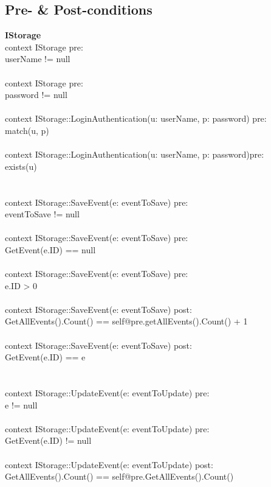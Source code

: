\subsection{Pre- \& Post-conditions}
\textbf{IStorage\\}
context IStorage pre:\\
userName != null\\\\
context IStorage pre:\\
password != null\\\\
context IStorage::LoginAuthentication(u: userName, p: password) pre:\\
match(u, p)\\\\
context IStorage::LoginAuthentication(u: userName, p: password)pre:\\
exists(u)\\\\\\
context IStorage::SaveEvent(e: eventToSave) pre:\\
eventToSave != null\\\\
context IStorage::SaveEvent(e: eventToSave) pre:\\
GetEvent(e.ID) == null\\\\
context IStorage::SaveEvent(e: eventToSave) pre:\\
e.ID > 0\\\\
context IStorage::SaveEvent(e: eventToSave) post:\\
GetAllEvents().Count() == self@pre.getAllEvents().Count() + 1\\\\
context IStorage::SaveEvent(e: eventToSave) post:\\
GetEvent(e.ID) == e\\\\\\
context IStorage::UpdateEvent(e: eventToUpdate) pre:\\
e != null\\\\
context IStorage::UpdateEvent(e: eventToUpdate) pre:\\
GetEvent(e.ID) != null\\\\
context IStorage::UpdateEvent(e: eventToUpdate) post:\\
GetAllEvents().Count() == self@pre.GetAllEvents().Count()\\\\
